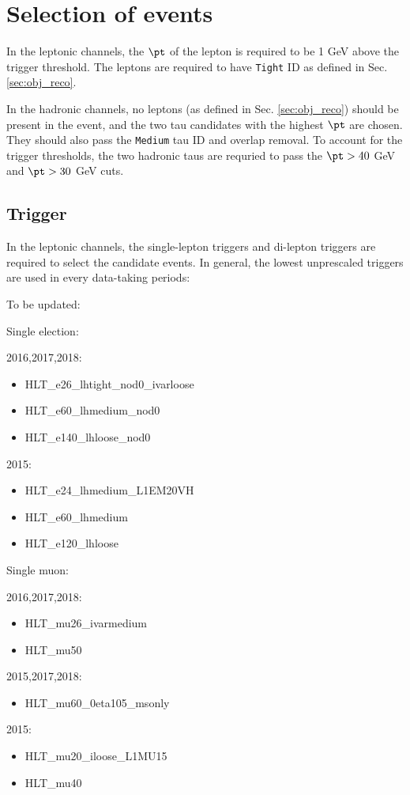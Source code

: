 \section{Selection of events}
\label{sec:selection}

In the leptonic channels, the $\pt$ of the lepton is required to be 1 GeV above the trigger threshold. The leptons are required to have \texttt{Tight} ID as defined in Sec. \ref{sec:obj_reco}. %

In the hadronic channels, no leptons (as defined in Sec. \ref{sec:obj_reco}) should be present in the event, and the two tau candidates with the highest $\pt$ are chosen. They should also pass the \texttt{Medium} tau ID and overlap removal. To account for the trigger thresholds, the two hadronic taus are requried to pass the $\pt>40$ GeV and $\pt>30$ GeV cuts.

\subsection{Trigger}
\label{sec:trigger}

In the leptonic channels, the single-lepton triggers and di-lepton triggers are required to select the candidate events. In general, the lowest unprescaled triggers are used in every data-taking periods:

To be updated:

Single election:

2016,2017,2018:
\begin{itemize}
	\item HLT\_e26\_lhtight\_nod0\_ivarloose
	\item HLT\_e60\_lhmedium\_nod0
	\item HLT\_e140\_lhloose\_nod0
\end{itemize}
2015:
\begin{itemize}
	\item HLT\_e24\_lhmedium\_L1EM20VH
	\item HLT\_e60\_lhmedium
	\item HLT\_e120\_lhloose
\end{itemize}

Single muon:

2016,2017,2018:
\begin{itemize}
	\item HLT\_mu26\_ivarmedium
	\item HLT\_mu50
\end{itemize}
2015,2017,2018:
\begin{itemize}
	\item HLT\_mu60\_0eta105\_msonly
\end{itemize}
2015:
\begin{itemize}
	\item HLT\_mu20\_iloose\_L1MU15
	\item HLT\_mu40
\end{itemize}

